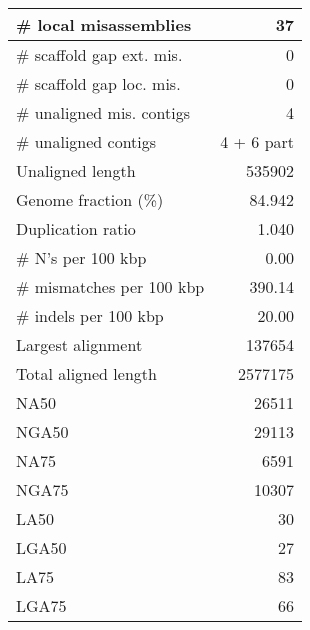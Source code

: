 \documentclass[12pt,a4paper]{article}
\begin{document}
\begin{table}[ht]
\begin{center}
\begin{tabular}{|l*{1}{|r}|}
\# local misassemblies & 37 \\ \hline
\# scaffold gap ext. mis. & 0 \\ \hline
\# scaffold gap loc. mis. & 0 \\ \hline
\# unaligned mis. contigs & 4 \\ \hline
\# unaligned contigs & 4 + 6 part \\ \hline
Unaligned length & 535902 \\ \hline
Genome fraction (\%) & 84.942 \\ \hline
Duplication ratio & 1.040 \\ \hline
\# N's per 100 kbp & 0.00 \\ \hline
\# mismatches per 100 kbp & 390.14 \\ \hline
\# indels per 100 kbp & 20.00 \\ \hline
Largest alignment & 137654 \\ \hline
Total aligned length & 2577175 \\ \hline
NA50 & 26511 \\ \hline
NGA50 & 29113 \\ \hline
NA75 & 6591 \\ \hline
NGA75 & 10307 \\ \hline
LA50 & 30 \\ \hline
LGA50 & 27 \\ \hline
LA75 & 83 \\ \hline
LGA75 & 66 \\ \hline
\end{tabular}
\end{center}
\end{table}
\end{document}
